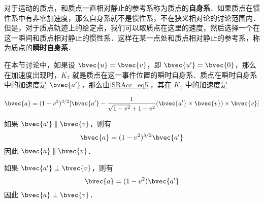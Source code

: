 对于运动的质点，和质点一直相对静止的参考系称为质点的\textbf{自身系}．如果质点在惯性系中有非零加速度，那么自身系就不是惯性系，不在狭义相对论的讨论范围内．但是，对于质点轨迹上的给定点，我们可以取质点在这里的速度，然后选择一个在这一瞬间和质点相对静止的惯性系．这样在某一点处和质点相对静止的参考系，称为质点的\textbf{瞬时自身系}．

在本节讨论中，如果设 $\bvec{u}=\bvec{v}$，即 $\bvec{u'}=\bvec{0}$，那么在加速度出现时，$K_2$ 就是质点在这一事件位置的瞬时自身系．质点在瞬时自身系中的加速度是 $\bvec{a'}$，那么由\autoref{SRAcc_eq5}，其在 $K_1$ 中的加速度是

\begin{equation}
\bvec{a}=(1-v^2)^{3/2}[\bvec{a'}-\frac{1}{\sqrt{1-v^2}+1-v^2}(\bvec{a'}\times\bvec{v})\times\bvec{v}]
\end{equation}

如果 $\bvec{a'}\parallel \bvec{v}$，则有
\begin{equation}
\bvec{a}=(1-v^2)^{3/2}\bvec{a'}
\end{equation}
因此 $\bvec{a}\parallel\bvec{v}$．

如果 $\bvec{a'}\perp \bvec{v}$，则有
\begin{equation}
\bvec{a}=(1-v^2)\bvec{a'}
\end{equation}
因此 $\bvec{a}\perp\bvec{v}$．


